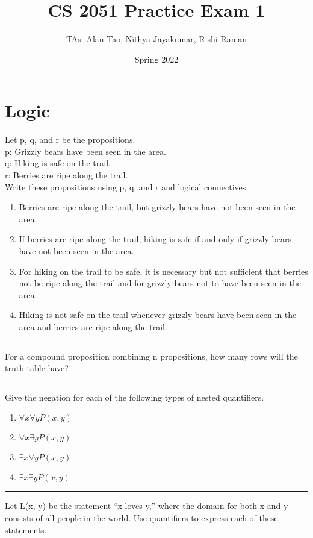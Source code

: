 \documentclass{article}
\title{CS 2051 Practice Exam 1}
\author {TAs: Alan Tao, Nithya Jayakumar, Rishi Raman}
\date{Spring 2022}
\begin{document}
    \maketitle
    \section{Logic}
        Let p, q, and r be the propositions. \\
    p: Grizzly bears have been seen in the area. \\
    q: Hiking is safe on the trail. \\
    r: Berries are ripe along the trail. \\
    Write these propositions using p, q, and r and logical connectives.
    \begin{enumerate}
        \item Berries are ripe along the trail, but grizzly bears have not been seen in the area.
        \item If berries are ripe along the trail, hiking is safe if and only if grizzly bears have not been seen in the area.
        \item For hiking on the trail to be safe, it is necessary but not sufficient that berries not be ripe along the trail and for grizzly bears not to have been seen in the area.
        \item Hiking is not safe on the trail whenever grizzly bears have been seen in the area and berries are ripe along the trail.
    \end{enumerate}
    \hrule
    \vspace{5 pt}
    For a compound proposition combining n propositions, how many rows will the truth table have?
    \vspace{5 pt}
    \hrule
    \vspace{5 pt}
    Give the negation for each of the following types of nested quantifiers.
    \begin{enumerate}
        \item $\forall x \forall y P(x,y)$
        \item $\forall x \exists y P(x,y)$
        \item $\exists x \forall y P(x,y)$
        \item $\exists x \exists y P(x,y)$
    \end{enumerate}
    \vspace{5 pt}
    \hrule
    \vspace{5 pt}
        Let L(x, y) be the statement “x loves y,” where the domain for both x and y consists of all people in the world. Use quantifiers to express each of these statements.
\end{document}

